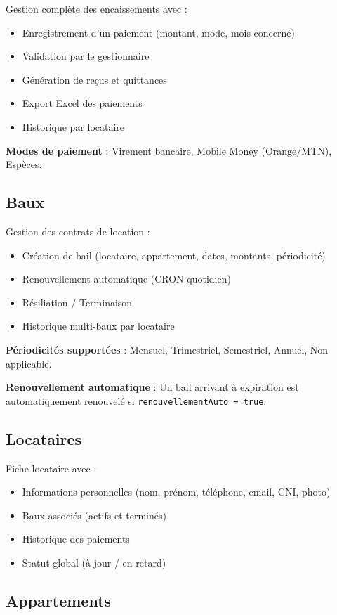 \documentclass[a4paper,11pt]{article}
\begin{document}
Gestion complète des encaissements avec :
\begin{itemize}
  \item Enregistrement d'un paiement (montant, mode, mois concerné)
  \item Validation par le gestionnaire
  \item Génération de reçus et quittances
  \item Export Excel des paiements
  \item Historique par locataire
\end{itemize}

\textbf{Modes de paiement} : Virement bancaire, Mobile Money (Orange/MTN), Espèces.

\subsection{Baux}

Gestion des contrats de location :
\begin{itemize}
  \item Création de bail (locataire, appartement, dates, montants, périodicité)
  \item Renouvellement automatique (CRON quotidien)
  \item Résiliation / Terminaison
  \item Historique multi-baux par locataire
\end{itemize}

\textbf{Périodicités supportées} : Mensuel, Trimestriel, Semestriel, Annuel, Non applicable.

\textbf{Renouvellement automatique} : Un bail arrivant à expiration est automatiquement renouvelé si \texttt{renouvellementAuto = true}.

\subsection{Locataires}

Fiche locataire avec :
\begin{itemize}
  \item Informations personnelles (nom, prénom, téléphone, email, CNI, photo)
  \item Baux associés (actifs et terminés)
  \item Historique des paiements
  \item Statut global (à jour / en retard)
\end{itemize}

\subsection{Appartements}
\end{document}
